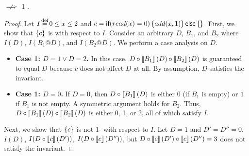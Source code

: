\begin{claim}\label{clm:iconfluence-not-implies-1-iconvergence}
  \iconfluence{} $\centernot\implies$ 1-\iconvergence{}.
\end{claim}
\begin{proof}
  Let
    $I \defeq 0 \leq x \leq 2$ and
    $c = \textsf{if}(read(x)=0)\left\{add(x,1)\right\}\textsf{else}\left\{\right\}$.
  First, we show that $\left\{c\right\}$ is \iconfluent{} with respect to $I$. Consider
  an arbitrary
    $D$,
    $B_1$, and
    $B_2$
  where
    $I(D)$,
    $I(B_1@D)$, and
    $I(B_2@D)$.
  We perform a case analysis on $D$.
  \begin{itemize}
    \item \textbf{Case 1: $D = 1 \lor D = 2$.}
      In this case, $D \circ \left\llbracket B_1\right\rrbracket(D) \circ \left\llbracket B_2\right\rrbracket(D)$ is
      guaranteed to equal $D$ because $c$ does not affect $D$ at all. By
      assumption, $D$ satisfies the invariant.
    \item \textbf{Case 1: $D = 0$.}
      If $D = 0$, then $D \circ \left\llbracket B_1\right\rrbracket(D)$ is either $0$ (if $B_1$ is
      empty) or $1$ if $B_1$ is not empty. A symmetric argument holds for
      $B_2$. Thus, $D \circ \left\llbracket B_1\right\rrbracket(D) \circ \left\llbracket B_2\right\rrbracket(D)$ is either 0,
      1, or 2, all of which satisfy $I$.
  \end{itemize}

  Next, we show that $\left\{c\right\}$ is not 1-\iconvergent{} with respect to $I$. Let
  $D = 1$ and $D' = D'' = 0$.
    $I(D)$,
    $I(D \circ \left\llbracket c\right\rrbracket(D'))$,
    $I(D \circ \left\llbracket c\right\rrbracket(D''))$,
  but
    $D \circ \left\llbracket c\right\rrbracket(D') \circ \left\llbracket c\right\rrbracket(D'') = 3$
  does not satisfy the invariant.
\end{proof}
